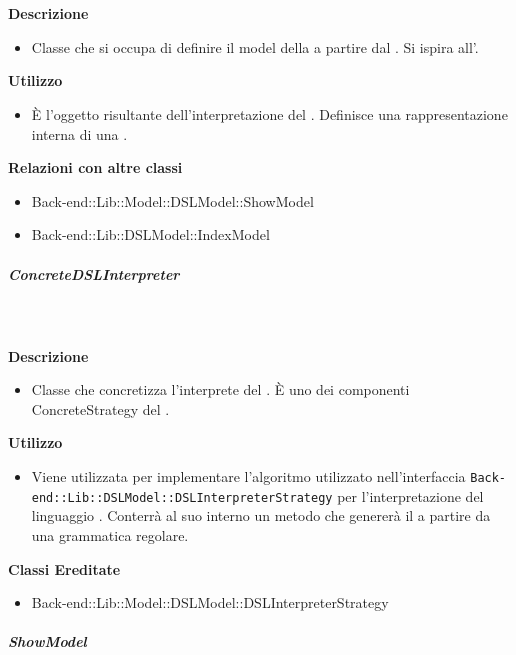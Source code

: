 				\textbf{\\ \\ Descrizione} 
					\begin{itemize}
						\item[] Classe che si occupa di definire il model della  a partire dal . Si ispira all'.
					\end{itemize}      
				\textbf{Utilizzo}  
					\begin{itemize}
						\item[] È l'oggetto risultante dell'interpretazione del . Definisce una rappresentazione interna di una .
					\end{itemize}
					\textbf{Relazioni con altre classi}
					\begin{itemize}
							\item{Back-end::Lib::Model::DSLModel::ShowModel}
							\item{Back-end::Lib::DSLModel::IndexModel}
					\end{itemize}
			\subparagraph{ConcreteDSLInterpreter}
				
				\textbf{\\ \\ Descrizione} 
					\begin{itemize}
						\item[] Classe che concretizza l'interprete del . È uno dei componenti ConcreteStrategy del  .
					\end{itemize}      
				\textbf{Utilizzo}  
					\begin{itemize}
						\item[] Viene utilizzata per implementare l'algoritmo utilizzato nell'interfaccia \texttt{Back-end::Lib::DSLModel::DSLInterpreterStrategy} per l'interpretazione del linguaggio . Conterrà al suo interno un metodo che genererà il  a partire da una grammatica regolare.
					\end{itemize}
					\textbf{Classi Ereditate}
					\begin{itemize}
								\item{Back-end::Lib::Model::DSLModel::DSLInterpreterStrategy}
					\end{itemize}
			\subparagraph{ShowModel}
				
